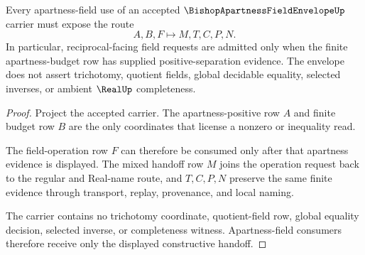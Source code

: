 \begin{theorem}\label{thm:bishop-apartness-field-envelope-apartness-field-handoff}
Every apartness-field use of an accepted $\BishopApartnessFieldEnvelopeUp$ carrier must expose the route
$$
A,B,F \longmapsto M,T,C,P,N .
$$
In particular, reciprocal-facing field requests are admitted only when the finite apartness-budget row has supplied positive-separation evidence. The envelope does not assert trichotomy, quotient fields, global decidable equality, selected inverses, or ambient $\RealUp$ completeness.
\end{theorem}
\begin{proof}
Project the accepted carrier. The apartness-positive row $A$ and finite budget row $B$ are the only coordinates that license a nonzero or inequality read.

The field-operation row $F$ can therefore be consumed only after that apartness evidence is displayed. The mixed handoff row $M$ joins the operation request back to the regular and Real-name route, and $T,C,P,N$ preserve the same finite evidence through transport, replay, provenance, and local naming.

The carrier contains no trichotomy coordinate, quotient-field row, global equality decision, selected inverse, or completeness witness. Apartness-field consumers therefore receive only the displayed constructive handoff.
\end{proof}




